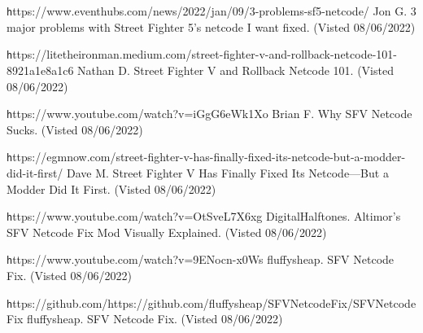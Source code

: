 \documentclass{entcs}
\begin{document}
\begin{thebibliography}{25}
 {\texttt https://www.eventhubs.com/news/2022/jan/09/3-problems-sf5-netcode/} Jon G. 3 major problems with Street Fighter 5's netcode I want fixed. (Visted 08/06/2022)

 {\texttt https://litetheironman.medium.com/street-fighter-v-and-rollback-netcode-101-8921a1e8a1c6} Nathan D. Street Fighter V and Rollback Netcode 101. (Visted 08/06/2022)

 {\texttt https://www.youtube.com/watch?v=iGgG6eWk1Xo} Brian F. Why SFV Netcode Sucks. (Visted 08/06/2022)

 {\texttt https://egmnow.com/street-fighter-v-has-finally-fixed-its-netcode-but-a-modder-did-it-first/} Dave M. Street Fighter V Has Finally Fixed Its Netcode—But a Modder Did It First. (Visted 08/06/2022)

 {\texttt https://www.youtube.com/watch?v=OtSveL7X6xg} DigitalHalftones.  Altimor's SFV Netcode Fix Mod Visually Explained. (Visted 08/06/2022)

 {\texttt https://www.youtube.com/watch?v=9ENocn-x0Ws} fluffysheap. SFV Netcode Fix. (Visted 08/06/2022)

 {\texttt https://github.com/https://github.com/fluffysheap/SFVNetcodeFix/SFVNetcodeFix} fluffysheap. SFV Netcode Fix. (Visted 08/06/2022)

\end{thebibliography}
\end{document}

